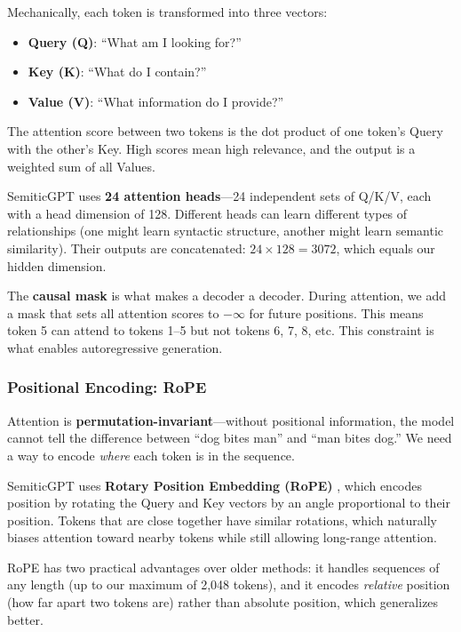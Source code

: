 \documentclass[11pt,a4paper]{article}
\begin{document}
Mechanically, each token is transformed into three vectors:
\begin{itemize}
    \item \textbf{Query (Q)}: ``What am I looking for?''
    \item \textbf{Key (K)}: ``What do I contain?''
    \item \textbf{Value (V)}: ``What information do I provide?''
\end{itemize}

The attention score between two tokens is the dot product of one token's Query with the other's Key. High scores mean high relevance, and the output is a weighted sum of all Values.

SemiticGPT uses \textbf{24 attention heads}---24 independent sets of Q/K/V, each with a head dimension of 128. Different heads can learn different types of relationships (one might learn syntactic structure, another might learn semantic similarity). Their outputs are concatenated: $24 \times 128 = 3072$, which equals our hidden dimension.

\begin{keyidea}
The \textbf{causal mask} is what makes a decoder a decoder. During attention, we add a mask that sets all attention scores to $-\infty$ for future positions. This means token 5 can attend to tokens 1--5 but not tokens 6, 7, 8, etc. This constraint is what enables autoregressive generation.
\end{keyidea}

\subsubsection{Positional Encoding: RoPE}

Attention is \textbf{permutation-invariant}---without positional information, the model cannot tell the difference between ``dog bites man'' and ``man bites dog.'' We need a way to encode \emph{where} each token is in the sequence.

SemiticGPT uses \textbf{Rotary Position Embedding (RoPE)} \citep{su2021rope}, which encodes position by rotating the Query and Key vectors by an angle proportional to their position. Tokens that are close together have similar rotations, which naturally biases attention toward nearby tokens while still allowing long-range attention.

RoPE has two practical advantages over older methods: it handles sequences of any length (up to our maximum of 2,048 tokens), and it encodes \emph{relative} position (how far apart two tokens are) rather than absolute position, which generalizes better.
\end{document}
